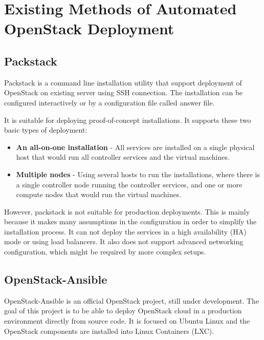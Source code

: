 \chapter{Existing Methods of Automated OpenStack Deployment}
\label{ch:existing}
\section{Packstack}
Packstack is a command line installation utility that support deployment of OpenStack on existing server using SSH connection. The installation can be configured interactively or by a configuration file called answer file. \cite{CL210}

It is suitable for deploying proof-of-concept installations. It supports these two basic types of deployment:
\begin{itemize}
  \item{\textbf{An all-on-one installation} - All services are installed on a single physical host that would run all controller services and the virtual machines.}
  \item{\textbf{Multiple nodes} - Using several hosts to run the installations, where there is a single controller node running the controller services, and one or more compute nodes that would run the virtual machines.}
  \\\cite{PackstackRDO}
\end{itemize}

However, packstack is not suitable for production deployments. This is mainly because it makes many assumptions in the configuration in order to simplify the installation process. It can not deploy the services in a high availability (HA) mode or using load balancers. It also does not support advanced networking configuration, which might be required by more complex setups. \cite{PackstackRedHat}

\section{OpenStack-Ansible}
OpenStack-Ansible is an official OpenStack project, still under development. The goal of this project is to be able to deploy OpenStack cloud in a production environment directly from source code. It is focused on Ubuntu Linux and the OpenStack components are installed into Linux Containers (LXC). \cite{OpenStackAnsibleOfficial} \cite{OpenStackAnsibleOfficialGit}
